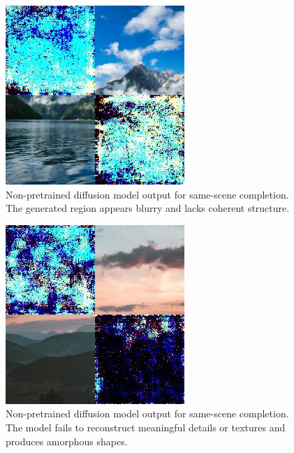 \documentclass[sigconf]{acmart}
\begin{document}
\begin{figure}[h!]
    \centering
    \includegraphics[width=\linewidth]{diffusion_step_2_1}
    \caption{Non-pretrained diffusion model output for same-scene completion. The generated region appears blurry and lacks coherent structure.}
    \label{fig:diffusion_step_2_1}
\end{figure}

\begin{figure}[h!]
    \centering
    \includegraphics[width=\linewidth]{diffusion_step_2_2}
    \caption{Non-pretrained diffusion model output for same-scene completion. The model fails to reconstruct meaningful details or textures and produces amorphous shapes.}
    \label{fig:diffusion_step_2_2}
\end{figure}
\end{document}
